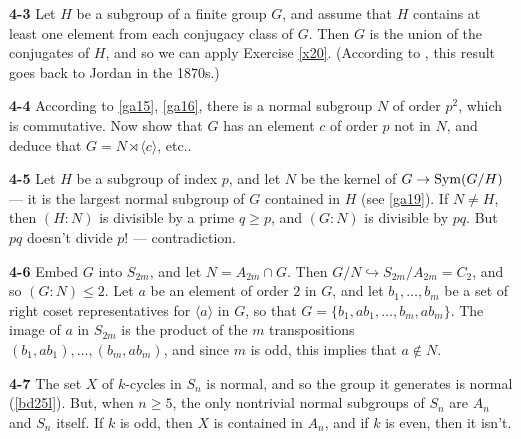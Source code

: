 \documentclass[a4paper,11pt,final,openany]{memoir}%
\theoremstyle{nonumberplain}
\begin{document}
\bigskip\noindent\textbf{4-3}
Let $H$ be a subgroup of a finite group $G$, and assume that $H$ contains at
least one element from each conjugacy class of $G$. Then $G$ is the union of
the conjugates of $H$, and so we can apply Exercise \ref{x20}.
(According to \cite{serre2003}, this result goes back to Jordan in the 1870s.)

\bigskip\noindent\textbf{4-4}
According to \ref{ga15}, \ref{ga16}, there is a normal subgroup $N$ of order
$p^{2}$, which is commutative. Now show that $G$ has an element $c$ of order
$p$ not in $N$, and deduce that $G=N\rtimes\langle c\rangle$, etc..

\bigskip\noindent\textbf{4-5}
Let $H$ be a subgroup of index $p$, and let $N$ be the kernel of
$G\rightarrow\operatorname{Sym}(G/H)$ --- it is the largest normal subgroup of $G$ contained
in $H$ (see \ref{ga19}). If $N\neq H$, then $(H:N)$ is divisible by a prime
$q\geq p$, and $(G:N)$ is divisible by $pq$. But $pq$ doesn't divide $p!$ --- contradiction.

\bigskip\noindent\textbf{4-6}
Embed $G$ into $S_{2m}$, and let $N=A_{2m}\cap G$. Then $G/N\hookrightarrow
S_{2m}/A_{2m}=C_{2}$, and so $(G:N)\leq2$. Let $a$ be an element of order $2$
in $G$, and let $b_{1},\ldots,b_{m}$ be a set of right coset representatives
for $\langle a\rangle$ in $G$, so that $G=\{b_{1},ab_{1},\ldots,b_{m}%
,ab_{m}\}$. The image of $a$ in $S_{2m}$ is the product of the $m$
transpositions $(b_{1},ab_{1}),\ldots,(b_{m},ab_{m})$, and since $m$ is odd,
this implies that $a\notin N$.

\bigskip\noindent\textbf{4-7}
The set $X$ of $k$-cycles in $S_{n}$ is normal, and so the group it generates
is normal (\ref{bd25l}). But, when $n\geq5$, the only nontrivial normal
subgroups of $S_{n}$ are $A_{n}$ and $S_{n}$ itself. If $k$ is odd, then $X$
is contained in $A_{n}$, and if $k$ is even, then it isn't.
\end{document}
